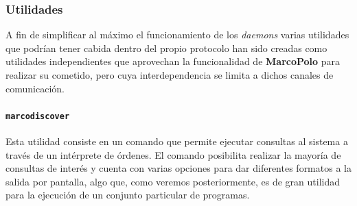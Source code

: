 






 
\subsubsection{Utilidades}

A fin de simplificar al máximo el funcionamiento de los \textit{daemons} varias utilidades que podrían tener cabida dentro del propio protocolo han sido creadas como utilidades independientes que aprovechan la funcionalidad de \textbf{MarcoPolo} para realizar su cometido, pero cuya interdependencia se limita a dichos canales de comunicación.

\paragraph{\texttt{marcodiscover}\\}
\label{marcodiscover}
Esta utilidad consiste en un comando que permite ejecutar consultas al sistema a través de un intérprete de órdenes. El comando posibilita realizar la mayoría de consultas de interés y cuenta con varias opciones para dar diferentes formatos a la salida por pantalla, algo que, como veremos posteriormente, es de gran utilidad para la ejecución de un conjunto particular de programas.

